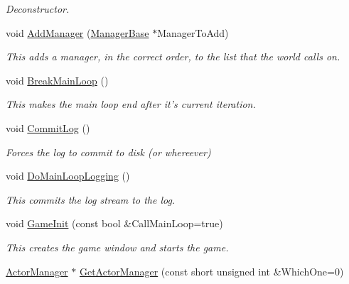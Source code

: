 \begin{DoxyCompactItemize}
\begin{DoxyCompactList}\small\item\em Deconstructor. \item\end{DoxyCompactList}\item 
void \hyperlink{classMezzanine_1_1World_a783c33688669c84f4c697465b75e10b6}{AddManager} (\hyperlink{classMezzanine_1_1ManagerBase}{ManagerBase} $\ast$ManagerToAdd)
\begin{DoxyCompactList}\small\item\em This adds a manager, in the correct order, to the list that the world calls on. \item\end{DoxyCompactList}\item 
void \hyperlink{classMezzanine_1_1World_a62999cde70050a850fd8191bde7440e3}{BreakMainLoop} ()
\begin{DoxyCompactList}\small\item\em This makes the main loop end after it's current iteration. \item\end{DoxyCompactList}\item 
void \hyperlink{classMezzanine_1_1World_a1cd71f4206c4b22cd887222511188a55}{CommitLog} ()
\begin{DoxyCompactList}\small\item\em Forces the log to commit to disk (or whereever) \item\end{DoxyCompactList}\item 
void \hyperlink{classMezzanine_1_1World_a3e3b7f68987ee841862835cec9c6f118}{DoMainLoopLogging} ()
\begin{DoxyCompactList}\small\item\em This commits the log stream to the log. \item\end{DoxyCompactList}\item 
void \hyperlink{classMezzanine_1_1World_a72d6d82926bfbfca96c246f109f0fc58}{GameInit} (const bool \&CallMainLoop=true)
\begin{DoxyCompactList}\small\item\em This creates the game window and starts the game. \item\end{DoxyCompactList}\item 
\hyperlink{classMezzanine_1_1ActorManager}{ActorManager} $\ast$ \hyperlink{classMezzanine_1_1World_abeee5435e00825ea4e776f508794c978}{GetActorManager} (const short unsigned int \&WhichOne=0)

\end{DoxyCompactItemize}

